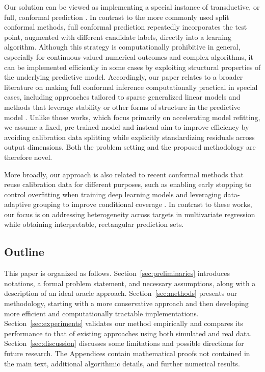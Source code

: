 Our solution can be viewed as implementing a special instance of transductive, or full, conformal prediction \citep{vovk2005algorithmic,vovk2013transductive}. In contrast to the more commonly used split conformal methods, full conformal prediction repeatedly incorporates the test point, augmented with different candidate labels, directly into a learning algorithm. Although this strategy is computationally prohibitive in general, especially for continuous-valued numerical outcomes and complex algorithms, it can be implemented efficiently in some cases by exploiting structural properties of the underlying predictive model. Accordingly, our paper relates to a broader literature on making full conformal inference computationally practical in special cases, including approaches tailored to sparse generalized linear models \citep{lei2019fast,guha2023conformalization} and methods that leverage stability or other forms of structure in the predictive model \citep{ndiaye2019computing, abad2022approximating, martinez2023approximating, li2024generalized}. Unlike those works, which focus primarily on accelerating model refitting, we assume a fixed, pre-trained model and instead aim to improve efficiency by avoiding calibration data splitting while explicitly standardizing residuals across output dimensions. Both the problem setting and the proposed methodology are therefore novel.

More broadly, our approach is also related to recent conformal methods that reuse calibration data for different purposes, such as enabling early stopping to control overfitting when training deep learning models \citep{liang2023conformal} and leveraging data-adaptive grouping to improve conditional coverage \citep{zhou2024conformal, zhang2024posterior}. In contrast to these works, our focus is on addressing heterogeneity across targets in multivariate regression while obtaining interpretable, rectangular prediction sets.


\subsection{Outline}

This paper is organized as follows.
Section~\ref{sec:preliminaries} introduces notations, a formal problem statement, and necessary assumptions, along with a description of an ideal oracle approach.
Section~\ref{sec:methods} presents our methodology, starting with a more conservative approach and then developing more efficient and computationally tractable implementations.
Section~\ref{sec:experiments} validates our method empirically and compares its performance to that of existing approaches using both simulated and real data.
Section~\ref{sec:discussion} discusses some limitations and possible directions for future research.
The Appendices contain mathematical proofs not contained in the main text, additional algorithmic details, and further numerical results.
 
